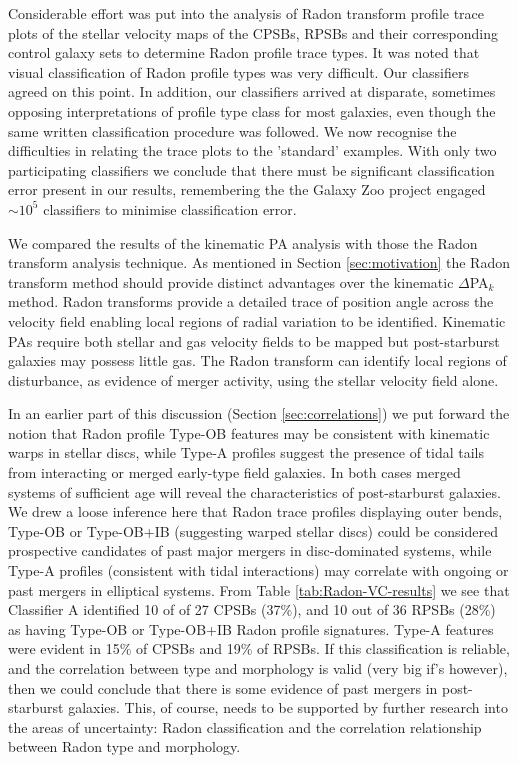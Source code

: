 Considerable effort was put into the analysis of Radon transform profile trace plots of the stellar velocity maps of the CPSBs, RPSBs and their corresponding control galaxy sets to determine Radon profile trace types. It was noted that visual classification of Radon profile types was very difficult. Our classifiers agreed on this point. In addition, our classifiers arrived at disparate, sometimes opposing interpretations of profile type class for most galaxies, even though the same written classification procedure was followed. We now recognise the difficulties in relating the trace plots to the 'standard' examples. With only two participating classifiers we conclude that there must be significant classification error present in our results, remembering the the Galaxy Zoo project engaged $\sim10^5$ classifiers to minimise classification error.

We compared the results of the kinematic PA analysis with those the Radon transform analysis technique. As mentioned in Section \ref{sec:motivation} the Radon transform method should provide distinct advantages over the kinematic $\Delta$PA$_{k}$ method. Radon transforms provide a detailed trace of position angle across the velocity field enabling local regions of radial variation to be identified. Kinematic PAs require both stellar and gas velocity fields to be mapped but post-starburst galaxies may possess little gas. The Radon transform can identify local regions of disturbance, as evidence of merger activity, using the stellar velocity field alone.

In an earlier part of this discussion (Section  \ref{sec:correlations}) we put forward the notion that Radon profile Type-OB features may be consistent with kinematic warps in stellar discs, while Type-A profiles suggest the presence of tidal tails from interacting or merged early-type field galaxies. In both cases merged systems of sufficient age will reveal the characteristics of post-starburst galaxies. We drew a loose inference here that Radon trace profiles displaying outer bends, Type-OB or Type-OB+IB (suggesting warped stellar discs) could be considered prospective candidates of past major mergers in disc-dominated systems, while Type-A profiles (consistent with tidal interactions) may correlate with ongoing or past mergers in elliptical systems. From Table \ref{tab:Radon-VC-results} we see that Classifier A identified 10 of of 27 CPSBs (37\%), and 10 out of 36 RPSBs (28\%) as having Type-OB or Type-OB+IB Radon profile signatures. Type-A features were evident in  15\% of CPSBs and 19\% of RPSBs. If this classification is reliable, and the correlation between type and morphology is valid (very big if's however), then we could conclude that there is some evidence of past mergers in post-starburst galaxies. This, of course, needs to be supported by further research into the areas of uncertainty: Radon classification and the correlation relationship between Radon type and morphology.

